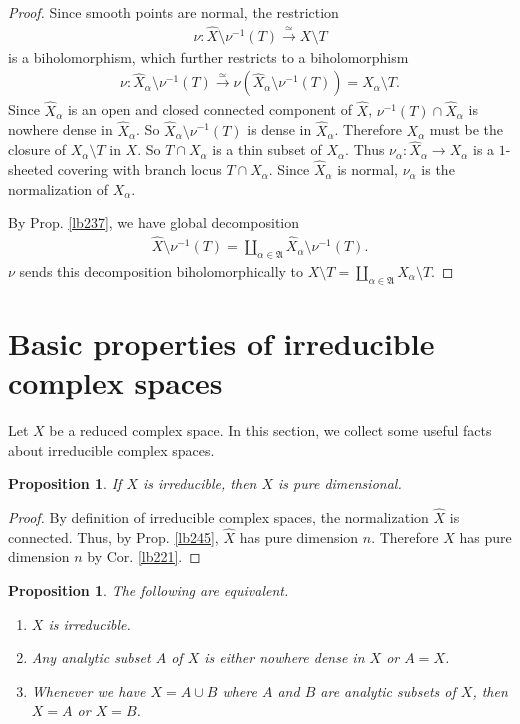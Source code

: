 \documentclass[12pt,b5paper,notitlepage]{report}
\theoremstyle{definition}
\theoremstyle{plain}
\newtheorem{pp}[df]{Proposition}
\newcommand{\fk}{\mathfrak}
\newcommand{\wht}{\widehat}
\numberwithin{equation}{section}
\begin{document}
\begin{proof}
Since smooth points are normal, the restriction
\begin{align*}
\nu:\wht X\setminus\nu^{-1}(T)\xrightarrow{\simeq} X\setminus T
\end{align*}
is a biholomorphism, which further restricts to a biholomorphism
\begin{align*}
\nu:\wht X_\alpha\setminus\nu^{-1}(T)\xrightarrow{\simeq}\nu(\wht X_\alpha\setminus\nu^{-1}(T))=X_\alpha\setminus T.
\end{align*}
Since $\wht X_\alpha$ is an open and closed connected component of $\wht X$, $\nu^{-1}(T)\cap\wht X_\alpha$ is nowhere dense in $\wht X_\alpha$. So $\wht X_\alpha\setminus\nu^{-1}(T)$ is dense in $\wht X_\alpha$. Therefore $X_\alpha$ must be the closure of $X_\alpha\setminus T$ in $X$. So $T\cap X_\alpha$ is a thin subset of $X_\alpha$. Thus $\nu_\alpha:\wht X_\alpha\rightarrow X_\alpha$ is a $1$-sheeted covering with branch locus $T\cap X_\alpha$. Since $\wht X_\alpha$ is normal, $\nu_\alpha$ is the normalization of $X_\alpha$.

By Prop. \ref{lb237}, we have global decomposition
\begin{align*}
\wht X\setminus\nu^{-1}(T)=\coprod_{\alpha\in\fk A}\wht X_\alpha\setminus\nu^{-1}(T).
\end{align*}
$\nu$ sends this decomposition biholomorphically to $X\setminus T=\coprod_{\alpha\in\fk A}X_\alpha\setminus T$.
\end{proof}




\section{Basic properties of irreducible complex spaces}

Let $X$ be a reduced complex space. In this section, we collect some useful facts about irreducible complex spaces. 


\begin{pp}
If $X$ is irreducible, then $X$ is pure dimensional.
\end{pp}

\begin{proof}
By definition of irreducible complex spaces, the normalization $\wht X$ is connected. Thus, by Prop. \ref{lb245}, $\wht X$ has pure dimension $n$. Therefore $X$ has pure dimension $n$ by Cor. \ref{lb221}.
\end{proof}


\begin{pp}\label{lb243}\label{lb239}
The following are equivalent.
\begin{enumerate}[label=(\arabic*)]
\item $X$ is irreducible.
\item Any analytic subset $A$ of $X$ is either nowhere dense in $X$ or $A=X$.
\item Whenever we have $X=A\cup B$ where $A$ and $B$ are analytic subsets of $X$, then $X=A$ or $X=B$.
\end{enumerate}
\end{pp}
\end{document}

